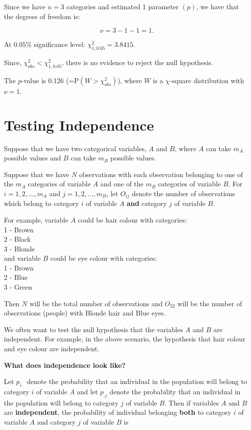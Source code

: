 \documentclass[
]{book}
\begin{document}
Since we have \(n=3\) categories and estimated 1 parameter \((p)\), we have that the degrees of freedom is:

\[ \nu = 3 - 1 -1 = 1. \]

At \(0.05\%\) significance level: \(\chi^2_{1,0.05} = 3.8415\).

Since, \(\chi^2_{obs} < \chi^2_{1,0.05}\),
there is no evidence to reject the null hypothesis.

The \(p\)-value is 0.126 (=\(\mathrm{P} (W > \chi^2_{obs})\)), where \(W\) is a \(\chi\)-square distribution with \(\nu =1\).

\hypertarget{Hypo_Test_Discrete:Independence}{%
\section{Testing Independence}\label{Hypo_Test_Discrete:Independence}}

Suppose that we have two categorical variables, \(A\) and \(B\), where \(A\) can take \(m_A\) possible values and \(B\) can take \(m_B\) possible values.

Suppose that we have \(N\) observations with each observation belonging to one of the \(m_A\) categories of variable \(A\) and one of the \(m_B\) categories of variable \(B\). For \(i=1,2,\ldots, m_A\) and \(j=1,2,\ldots,m_B\), let \(O_{ij}\) denote the number of observations which belong to category \(i\) of variable \(A\) \textbf{and} category \(j\) of variable \(B\).

For example, variable \(A\) could be hair colour with categories:\\
1 - Brown\\
2 - Black\\
3 - Blonde\\
and variable \(B\) could be eye colour with categories:\\
1 - Brown\\
2 - Blue\\
3 - Green

Then \(N\) will be the total number of observations and \(O_{32}\) will be the number of observations (people) with Blonde hair and Blue eyes.

We often want to test the null hypothesis that the variables \(A\) and \(B\) are independent. For example, in the above scenario, the hypothesis that hair colour and eye colour are independent.

{\textbf{What does independence look like?}}

Let \(p_{i \cdot}\) denote the probability that an individual in the population will belong to category \(i\) of variable \(A\) and let \(p_{\cdot j}\) denote the probability that an individual in the population will belong to category \(j\) of variable \(B\). Then if variables \(A\) and \(B\) are {\textbf{independent}}, the probability of individual belonging {\textbf{both}} to category \(i\) of variable \(A\) and category \(j\) of variable \(B\) is\\
\end{document}
